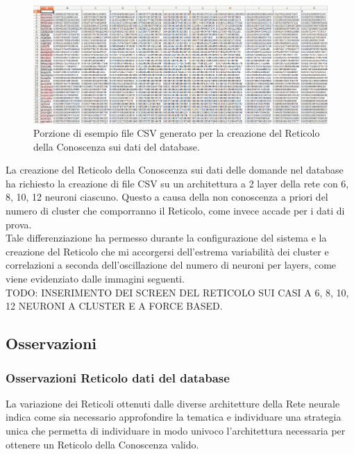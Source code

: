 \noindent
\begin{figure}[H]
\centering
	\includegraphics[width=1\linewidth]{./image/fileCSV_rete-db-10neuroni.png}
	\caption{Porzione di esempio file CSV generato per la creazione del Reticolo della Conoscenza sui dati del database.}
	\label{Porzione di esempio file CSV generato per la creazione del Reticolo della Conoscenza sui dati del database.}
\end{figure}
\noindent
La creazione del Reticolo della Conoscenza sui dati delle domande nel database ha richiesto la creazione di file CSV su un architettura a 2 layer della rete con 6, 8, 10, 12 neuroni ciascuno. Questo a causa della non conoscenza a priori del numero di cluster che comporranno il Reticolo, come invece accade per i dati di prova.\\
Tale differenziazione ha permesso durante la configurazione del sistema e la creazione del Reticolo che mi accorgersi dell'estrema variabilit\`a dei cluster e correlazioni a seconda dell'oscillazione del numero di neuroni per layers, come viene evidenziato dalle immagini seguenti.\\

TODO: INSERIMENTO DEI SCREEN DEL RETICOLO SUI CASI A 6, 8, 10, 12 NEURONI A CLUSTER E A FORCE BASED.

\subsection{Osservazioni}
\subsubsection{Osservazioni Reticolo dati del database}
La variazione dei Reticoli ottenuti dalle diverse architetture della Rete neurale indica come sia necessario approfondire la tematica e individuare una strategia unica che permetta di individuare in modo univoco l'architettura necessaria per ottenere un Reticolo della Conoscenza valido.

